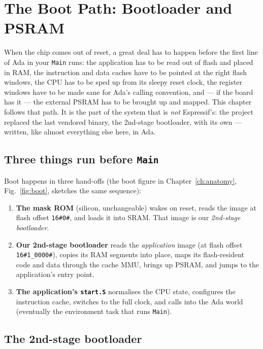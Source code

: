 \chapter{The Boot Path: Bootloader and PSRAM}
\label{ch:bootloader}

When the chip comes out of reset, a great deal has to happen before the first
line of Ada in your \texttt{Main} runs: the application has to be read out of
flash and placed in RAM, the instruction and data caches have to be pointed at
the right flash windows, the CPU has to be sped up from its sleepy reset clock,
the register windows have to be made sane for Ada's calling convention, and ---
if the board has it --- the external PSRAM has to be brought up and mapped. This
chapter follows that path. It is the part of the system that is \emph{not}
Espressif's: the project replaced the last vendored binary, the 2nd-stage
bootloader, with its own --- written, like almost everything else here, in Ada.

\section{Three things run before \texttt{Main}}

Boot happens in three hand-offs (the boot figure in
Chapter~\ref{ch:anatomy}, Fig.~\ref{fig:boot}, sketches the same sequence):

\begin{enumerate}
\item \textbf{The mask ROM} (silicon, unchangeable) wakes on reset, reads the
  image at flash offset \texttt{16\#0\#}, and loads it into SRAM. That image is our
  \emph{2nd-stage bootloader}.
\item \textbf{Our 2nd-stage bootloader} reads the \emph{application} image (at
  flash offset \texttt{16\#1\_0000\#}), copies its RAM segments into place, maps its
  flash-resident code and data through the cache MMU, brings up PSRAM, and jumps
  to the application's entry point.
\item \textbf{The application's \texttt{start.S}} normalises the CPU state,
  configures the instruction cache, switches to the full clock, and calls into
  the Ada world (eventually the environment task that runs \texttt{Main}).
\end{enumerate}

\section{The 2nd-stage bootloader}

